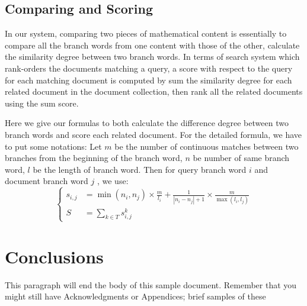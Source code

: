 \documentclass{acm_proc_article-sp}
\begin{document}
\subsection{Comparing and Scoring}
In our system, comparing two pieces of mathematical content is essentially to compare all the branch words from one content with those of the other, calculate the similarity degree between two branch words. In terms of search system which rank-orders the documents matching a query, a score with respect to the query for each matching document is computed by sum the similarity degree for each related document in the document collection, then rank all the related documents using the sum score.

Here we give our formulas to both calculate the difference degree between two branch words and score each related document. For the detailed formula, we have to put some notations: Let $m$ be the number of continuous matches between two branches from the beginning of the branch word, $n$ be number of same branch word, $l$ be the length of branch word. Then for query branch word $i$ and document branch word $j$ , we use:
$$
\left\{ \begin{array}{ll}
s_{i,j} &= \min(n_i, n_j) \times \frac{m}{l_i} + \frac{1}{|n_i - n_j| + 1} \times \frac{m}{\max(l_i, l_j)} \\
S &= \sum_{k \in T}{s^{k}_{i,j}}
\end{array} \right.
$$

\section{Conclusions}
This paragraph will end the body of this sample document.
Remember that you might still have Acknowledgments or
Appendices; brief samples of these


\end{document}
